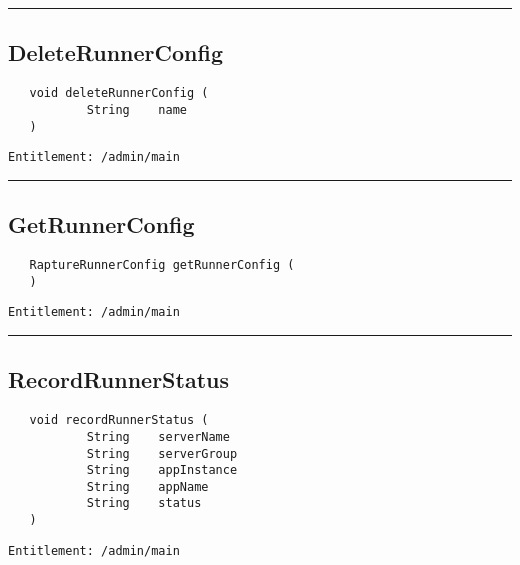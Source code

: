 \rule{12cm}{2pt}
\subsection{DeleteRunnerConfig}
\label{Api:DeleteRunnerConfig}
\begin{verbatim}
   void deleteRunnerConfig (
           String    name
   )
\end{verbatim}
\begin{Verbatim}[fontsize=\small, formatcom=\color{Maroon}]
  Entitlement: /admin/main
\end{Verbatim}



\rule{12cm}{2pt}
\subsection{GetRunnerConfig}
\label{Api:GetRunnerConfig}
\begin{verbatim}
   RaptureRunnerConfig getRunnerConfig (
   )
\end{verbatim}
\begin{Verbatim}[fontsize=\small, formatcom=\color{Maroon}]
  Entitlement: /admin/main
\end{Verbatim}



\rule{12cm}{2pt}
\subsection{RecordRunnerStatus}
\label{Api:RecordRunnerStatus}
\begin{verbatim}
   void recordRunnerStatus (
           String    serverName
           String    serverGroup
           String    appInstance
           String    appName
           String    status
   )
\end{verbatim}
\begin{Verbatim}[fontsize=\small, formatcom=\color{Maroon}]
  Entitlement: /admin/main
\end{Verbatim}



